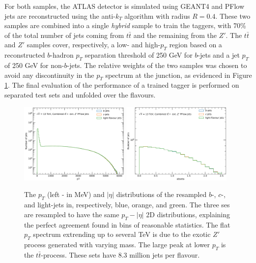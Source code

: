 For both samples, the ATLAS detector is simulated using GEANT4 \cite{Agostinelli:602040} and PFlow jets are reconstructed using the anti-$k_T$ algorithm with radius $R = 0.4$. These two samples are combined into a single \textit{hybrid} sample to train the taggers, with 70\% of the total number of jets coming from $t\bar{t}$ and the remaining from the $Z'$. The $t\bar{t}$ and $Z'$ samples cover, respectively, a low- and high-$p_T$ region based on a reconstructed $b$-hadron $p_T$ separation threshold of 250 GeV for $b$-jets and a jet $p_T$ of 250 GeV for non-$b$-jets. The relative weights of the two samples was chosen to avoid any discontinuity in the $p_T$ spectrum at the junction, as evidenced in Figure \ref{fig:distTraining}. The final evaluation of the performance of a trained tagger is performed on separated test sets and unfolded over the flavours.\\

\begin{figure}[h!]
  \center
  \includegraphics[width=0.48\textwidth]{Images/FTAG/DL1d/ptdist.png}
  \includegraphics[width=0.48\textwidth]{Images/FTAG/DL1d/etadist.png}
  \caption{The $p_T$ (left - in MeV) and $|\eta|$ distributions of the resampled $b$-, $c$-, and light-jets in, respectively, blue, orange, and green. The three ses are resampled to have the same $p_T-|\eta|$ 2D distributions, explaining the perfect agreement found in bins of reasonable statistics. The flat $p_T$ spectrum extrending up to several TeV is due to the exotic $Z'$ process generated with varying mass. The large peak at lower $p_T$ is the $t\bar{t}$-process. These sets have 8.3 million jets per flavour.} 
  \label{fig:distTraining}
\end{figure}


